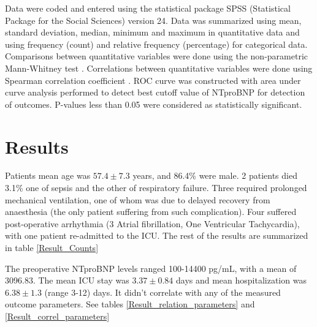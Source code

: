 \documentclass[14pt,a4paper,onecolumn]{extarticle}
\begin{document}
Data were coded and entered using the statistical package SPSS (Statistical Package for the Social Sciences) version 24. Data was summarized using mean, standard deviation, median, minimum and maximum in quantitative data and using frequency (count) and relative frequency (percentage) for categorical data. Comparisons between quantitative variables were done using the non-parametric Mann-Whitney test \citep{Chan_a_2003}. Correlations between quantitative variables were done using Spearman correlation coefficient \citep{Chan_b_2003}.  ROC curve was constructed with area under curve analysis performed to detect best cutoff value of NTproBNP for detection of outcomes. P-values less than 0.05 were considered as statistically significant.


\section{Results}


Patients mean age was $57.4\pm7.3$ years, and 86.4\% were male. 2 patients died 3.1\% one of sepsis and the other of respiratory failure. Three required prolonged mechanical ventilation, one of whom was due to delayed recovery from anaesthesia (the only patient suffering from such complication). Four suffered post-operative arrhythmia (3 Atrial fibrillation, One Ventricular Tachycardia), with one patient re-admitted to the ICU.  The rest of the results are summarized in table \ref{Result_Counts}

The preoperative NTproBNP levels ranged 100-14400 pg/mL, with a mean of 3096.83. The mean ICU stay was $3.37\pm0.84$ days and mean hospitalization was $6.38\pm1.3$ (range 3-12) days. It didn't correlate with any of the measured outcome parameters. See tables \ref{Result_relation_parameters} and \ref{Result_correl_parameters}
\end{document}
